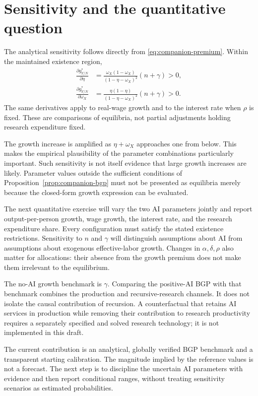 \section{Sensitivity and the quantitative question}
\label{sec:companion-sensitivity}

The analytical sensitivity follows directly from
\eqref{eq:companion-premium}. Within the maintained existence region,
\begin{align}
 \frac{\partial g_{Y/N}^*}{\partial\eta}
 &=\frac{\omega_X(1-\omega_X)}{(1-\eta-\omega_X)^2}(n+\gamma)>0,
 \label{eq:companion-sensitivity-eta}\\
 \frac{\partial g_{Y/N}^*}{\partial\omega_X}
 &=\frac{\eta(1-\eta)}{(1-\eta-\omega_X)^2}(n+\gamma)>0.
 \label{eq:companion-sensitivity-omega}
\end{align}
The same derivatives apply to real-wage growth and to the interest rate
when $\rho$ is fixed. These are comparisons of equilibria, not partial
adjustments holding research expenditure fixed.

The growth increase is amplified as $\eta+\omega_X$ approaches one from
below. This makes the empirical plausibility of the parameter combinations
particularly important. Such sensitivity is not itself evidence that large
growth increases are likely. Parameter values outside the sufficient
conditions of Proposition~\ref{prop:companion-bgp} must not be presented as
equilibria merely because the closed-form growth expression can be evaluated.

The next quantitative exercise will vary the two AI parameters jointly and
report output-per-person growth, wage growth, the interest rate, and the
research expenditure share. Every configuration must satisfy the stated
existence restrictions. Sensitivity to $n$ and $\gamma$ will distinguish
assumptions about AI from assumptions about exogenous effective-labor growth.
Changes in $\alpha,\delta,\rho$ also matter for allocations: their absence
from the growth premium does not make them irrelevant to the equilibrium.

The no-AI growth benchmark is $\gamma$. Comparing the positive-AI BGP with
that benchmark combines the production and recursive-research channels.
It does not isolate the causal contribution of recursion. A counterfactual
that retains AI services in production while removing their contribution to
research productivity requires a separately specified and solved research
technology; it is not implemented in this draft.

The current contribution is an analytical, globally verified BGP benchmark
and a transparent starting calibration. The magnitude implied by the
reference values is not a forecast. The next step is to discipline the
uncertain AI parameters with evidence and then report conditional ranges,
without treating sensitivity scenarios as estimated probabilities.
